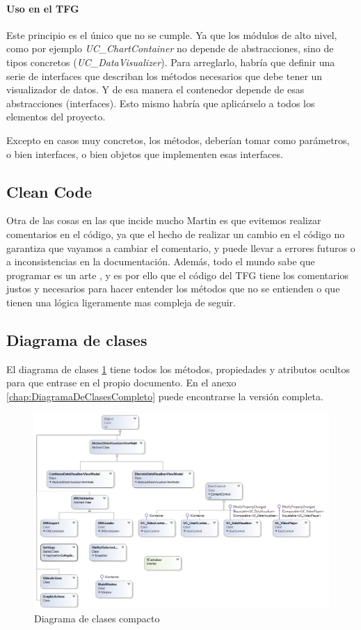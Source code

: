 \paragraph{Uso en el TFG}
Este principio es el \'unico que no se cumple. Ya que los m\'odulos de alto nivel, como por ejemplo
\emph{UC\_ChartContainer} no depende de abstracciones, sino de tipos concretos (\emph{UC\_DataVisualizer}).
Para arreglarlo, habr\'ia que definir una serie de interfaces que describan los m\'etodos necesarios que 
debe tener un visualizador de datos. Y de esa manera el contenedor depende de esas abstracciones (interfaces).
Esto mismo habr\'ia que aplic\'arselo a todos los elementos del proyecto.

Excepto en casos muy concretos, los m\'etodos, deber\'ian tomar como par\'ametros, o bien interfaces, o bien
objetos que implementen esas interfaces.

\subsection{Clean Code}
Otra de las cosas en las que incide mucho Martin es que evitemos realizar comentarios en el c\'odigo,
ya que el hecho de realizar un cambio en el c\'odigo no garantiza que vayamos a cambiar el comentario, y 
puede llevar a errores futuros o a inconsistencias en la documentaci\'on. Adem\'as, todo el mundo sabe que programar
es un arte \cite{Art:Programming}, y es por ello que el c\'odigo del TFG tiene los comentarios justos y necesarios
para hacer entender los m\'etodos que no se entienden o que tienen una l\'ogica ligeramente mas compleja de seguir.

\subsection{Diagrama de clases}
El diagrama de clases \ref{fig:ClassDiagram} tiene todos los m\'etodos, propiedades y atributos ocultos para que entrase
en el propio documento. En el anexo \ref{chap:DiagramaDeClasesCompleto} puede encontrarse la versi\'on completa.

\begin{figure}[H]
	\centering
	\includegraphics[width=1.2\linewidth]{./Figures/ClassDiagram}
	\caption[Diagrama de clases compacto]{Diagrama de clases compacto}
	\label{fig:ClassDiagram}
\end{figure}


